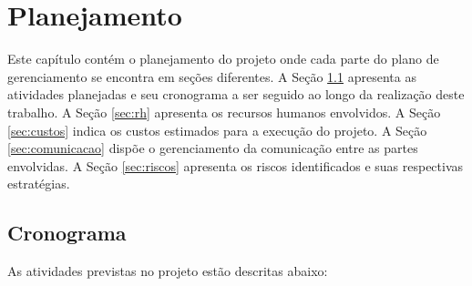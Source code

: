\documentclass[
	12pt,				%
	openright,			%
	twoside,			%
	a4paper,			%
	english,			%
	brazil,				%
	]{abntex2}
\begin{document}




\def\coordenador{Renato Cislaghi}
\def\orientador{Vinicius Marino Calvo Torres de Freitas}
\def\coorientador{Márcio Bastos Castro}
\def\autor{Thales Alexandre Zirbel Hubner}

\chapter{Planejamento}

Este capítulo contém o planejamento do projeto onde cada parte do plano de gerenciamento se encontra em seções diferentes. A Seção \ref{sec:cronograma} apresenta as atividades planejadas e seu cronograma a ser seguido ao longo da realização deste trabalho. A Seção \ref{sec:rh} apresenta os recursos humanos envolvidos. A Seção \ref{sec:custos} indica os custos estimados para a execução do projeto. A Seção \ref{sec:comunicacao} dispõe o gerenciamento da comunicação entre as partes envolvidas. A Seção \ref{sec:riscos} apresenta os riscos identificados e suas respectivas estratégias.

\section{Cronograma}
\label{sec:cronograma}

As atividades previstas no projeto estão descritas abaixo:
\end{document}
